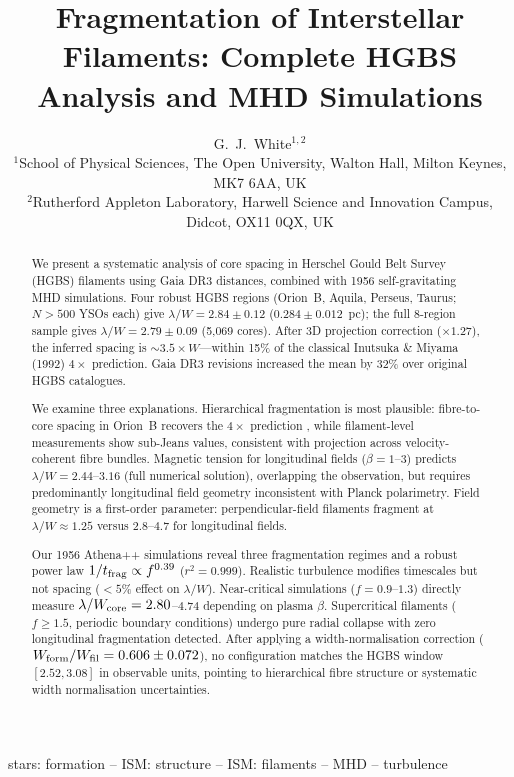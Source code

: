 \documentclass[twoside,twocolumn]{mnras}
\title{Fragmentation of Interstellar Filaments: Complete HGBS Analysis and MHD Simulations}
\author[G.~J.~White]{G.~J.~White$^{1,2}$\\
$^{1}$School of Physical Sciences, The Open University, Walton Hall, Milton Keynes, MK7 6AA, UK\\
$^{2}$Rutherford Appleton Laboratory, Harwell Science and Innovation Campus, Didcot, OX11 0QX, UK}
\begin{document}
\maketitle

\begin{abstract}
We present a systematic analysis of core spacing in Herschel Gould Belt Survey (HGBS)
filaments using Gaia DR3 distances, combined with 1956 self-gravitating MHD simulations.
Four robust HGBS regions (Orion~B, Aquila, Perseus, Taurus; $N>500$ YSOs each) give
$\lambda/W = 2.84 \pm 0.12$ ($0.284 \pm 0.012$~pc); the full 8-region sample gives
$\lambda/W = 2.79 \pm 0.09$ (5,069 cores). After 3D projection correction ($\times 1.27$),
the inferred spacing is ${\sim}3.5\times W$---within 15\% of the classical
Inutsuka \& Miyama (1992) $4\times$ prediction. Gaia DR3 revisions increased
the mean by 32\% over original HGBS catalogues.

We examine three explanations. Hierarchical fragmentation is most plausible: fibre-to-core
spacing in Orion~B recovers the $4\times$ prediction \citep{Yang2024}, while
filament-level measurements show sub-Jeans values, consistent with projection across
velocity-coherent fibre bundles. Magnetic tension for longitudinal fields ($\beta = 1$--$3$)
predicts $\lambda/W = 2.44$--$3.16$ (full numerical solution), overlapping the observation,
but requires predominantly longitudinal field geometry inconsistent with Planck polarimetry.
Field geometry is a first-order parameter: perpendicular-field filaments fragment at
$\lambda/W \approx 1.25$ versus $2.8$--$4.7$ for longitudinal fields.

Our 1956 Athena++ simulations reveal three fragmentation regimes and a robust power law
$1/t_{\rm frag} \propto f^{0.39}$ ($r^2 = 0.999$). Realistic turbulence modifies
timescales but not spacing ($<5\%$ effect on $\lambda/W$). Near-critical simulations
($f = 0.9$--$1.3$) directly measure $\lambda/W_{\rm core} = 2.80$--$4.74$ depending on
plasma $\beta$. Supercritical filaments ($f \geq 1.5$, periodic boundary conditions)
undergo pure radial collapse with zero longitudinal fragmentation detected.
After applying a width-normalisation correction ($W_{\rm form}/W_{\rm fil} = 0.606 \pm 0.072$),
no configuration matches the HGBS window $[2.52, 3.08]$ in observable units, pointing to
hierarchical fibre structure or systematic width normalisation uncertainties.
\end{abstract}

\begin{keywords}
stars: formation -- ISM: structure -- ISM: filaments -- MHD -- turbulence
\end{keywords}
\end{document}
